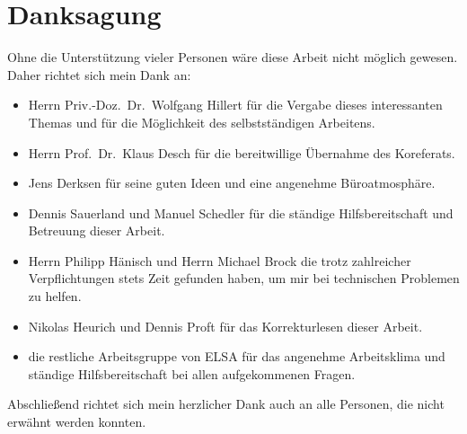 \chapter*{Danksagung}
\label{sec:danksagung}
Ohne die Unterstützung vieler Personen wäre diese Arbeit nicht möglich gewesen.
Daher richtet sich mein Dank an:
\begin{itemize}
	\item Herrn Priv.-Doz.\ Dr.\ Wolfgang Hillert für die Vergabe dieses interessanten Themas und für die Möglichkeit des selbstständigen Arbeitens.
	
	\item Herrn Prof.\ Dr.\ Klaus Desch für die bereitwillige Übernahme des Koreferats.
	
	\item Jens Derksen für seine guten Ideen und eine angenehme Büroatmosphäre.
	
	\item Dennis Sauerland und Manuel Schedler für die ständige Hilfsbereitschaft und Betreuung dieser Arbeit.
	
	\item Herrn Philipp Hänisch und Herrn Michael Brock die trotz zahlreicher Verpflichtungen stets Zeit gefunden haben, um mir bei technischen Problemen zu helfen.
	
	\item Nikolas Heurich und Dennis Proft für das Korrekturlesen dieser Arbeit.
	
	\item die restliche Arbeitsgruppe von ELSA für das angenehme Arbeitsklima und ständige Hilfsbereitschaft bei allen aufgekommenen Fragen.
\end{itemize}
Abschließend richtet sich mein herzlicher Dank auch an alle Personen, die nicht erwähnt werden konnten.